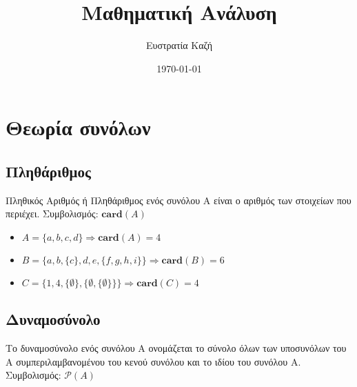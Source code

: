 \documentclass[10pt,a4paper]{article}
\author{Ευστρατία Καζή}
\title{Μαθηματική Ανάλυση}
\date{\today}
\begin{document}
\begin{titlepage}
\maketitle
\end{titlepage}

\tableofcontents
\pagebreak

\section{Θεωρία συνόλων}
\subsection{Πληθάριθμος}
Πληθικός Αριθμός ή Πληθάριθμος ενός συνόλου Α είναι ο αριθμός των στοιχείων που περιέχει. Συμβολισμός: $\mathbf{card}(A)$

\begin{itemize}
\item $A = \{a, b, c, d\} \Rightarrow \mathbf{card}(A) = 4$
\item $B = \{a, b, \{c\}, d, e, \{f, g, h, i\}\} \Rightarrow \mathbf{card}(B) = 6$
\item $C = \{1, 4, \{\emptyset\}, \{\emptyset, \{\emptyset\}\}\} \Rightarrow \mathbf{card}(C) = 4$
\end{itemize}

\subsection{Δυναμοσύνολο}
Το δυναμοσύνολο ενός συνόλου A ονομάζεται το σύνολο όλων των υποσυνόλων του Α συμπεριλαμβανομένου του κενού συνόλου και το ιδίου του συνόλου Α. Συμβολισμός: $\mathcal{P}(A)$
\end{document}
